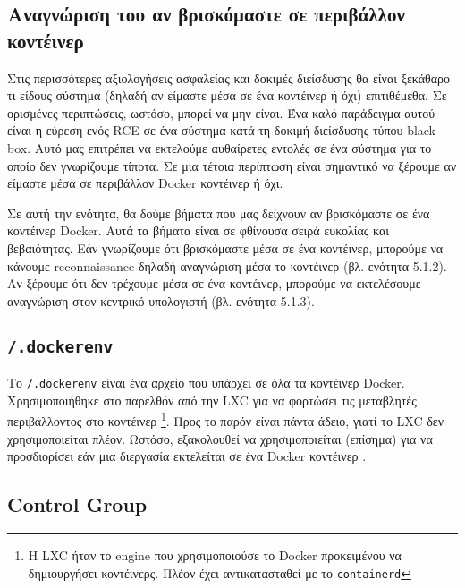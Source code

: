 \subsection{Αναγνώριση του αν βρισκόμαστε σε περιβάλλον κοντέινερ}

Στις περισσότερες αξιολογήσεις ασφαλείας και δοκιμές διείσδυσης θα είναι
ξεκάθαρο τι είδους σύστημα (δηλαδή αν είμαστε μέσα σε ένα κοντέινερ ή όχι)
επιτιθέμεθα. Σε ορισμένες περιπτώσεις, ωστόσο, μπορεί να μην είναι. Ένα καλό
παράδειγμα αυτού είναι η εύρεση ενός \textlatin{RCE} σε ένα σύστημα κατά τη
δοκιμή διείσδυσης τύπου \textlatin{black box}. Αυτό μας επιτρέπει να εκτελούμε
αυθαίρετες εντολές σε ένα σύστημα για το οποίο δεν γνωρίζουμε τίποτα. Σε μια
τέτοια περίπτωση είναι σημαντικό να ξέρουμε αν είμαστε μέσα σε περιβάλλον
\textlatin{Docker} κοντέινερ ή όχι.

Σε αυτή την ενότητα, θα δούμε βήματα που μας δείχνουν αν βρισκόμαστε σε ένα
κοντέινερ \textlatin{Docker}. Αυτά τα βήματα είναι σε φθίνουσα σειρά ευκολίας
και βεβαιότητας. Εάν γνωρίζουμε ότι βρισκόμαστε μέσα σε ένα κοντέινερ, μπορούμε
να κάνουμε \textlatin{reconnaissance} δηλαδή αναγνώριση μέσα το κοντέινερ (βλ.
ενότητα 5.1.2). Αν ξέρουμε ότι δεν τρέχουμε μέσα σε ένα κοντέινερ, μπορούμε να
εκτελέσουμε αναγνώριση στον κεντρικό υπολογιστή (βλ. ενότητα 5.1.3).

\subsection{\texttt{\textlatin{/.dockerenv}}}

Το \texttt{\textlatin{/.dockerenv}} είναι ένα αρχείο που υπάρχει σε όλα τα
κοντέινερ \textlatin{Docker}. Χρησιμοποιήθηκε στο παρελθόν από την
\textlatin{LXC} για να φορτώσει τις μεταβλητές περιβάλλοντος στο κοντέινερ
\footnote{Η \textlatin{LXC} ήταν το \textlatin{engine} που χρησιμοποιούσε το
\textlatin{Docker} προκειμένου να δημιουργήσει κοντέινερς. Πλέον έχει
αντικατασταθεί με το \texttt{\textlatin{containerd}}}.
Προς το παρόν είναι πάντα άδειο, γιατί το \textlatin{LXC} δεν χρησιμοποιείται
πλέον. Ωστόσο, εξακολουθεί να χρησιμοποιείται (επίσημα) για να προσδιορίσει εάν
μια διεργασία εκτελείται σε ένα \textlatin{Docker} κοντέινερ
\cite{Metasploit-Linux-Gather-Container-Detection}
\cite{Removed-Dockerinit-Reference}.


\subsection{\textlatin{Control Group}}

